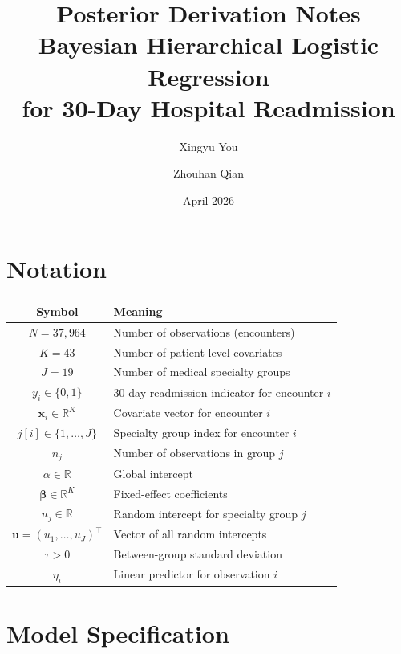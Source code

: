 \documentclass[11pt]{article}
\title{Posterior Derivation Notes\\[4pt]
       \large Bayesian Hierarchical Logistic Regression\\
       for 30-Day Hospital Readmission}
\author{Xingyu You \and Zhouhan Qian}
\date{April 2026}
\newcommand{\bx}{\bm{x}}
\newcommand{\bbeta}{\bm{\beta}}
\newcommand{\bu}{\bm{u}}
\begin{document}
\maketitle
\tableofcontents
\newpage

\section{Notation}

\begin{table}[h]
\centering
\begin{tabular}{cl}
\toprule
Symbol & Meaning \\
\midrule
$N = 37{,}964$ & Number of observations (encounters) \\
$K = 43$        & Number of patient-level covariates \\
$J = 19$        & Number of medical specialty groups \\
$y_i \in \{0,1\}$ & 30-day readmission indicator for encounter $i$ \\
$\bx_i \in \mathbb{R}^K$ & Covariate vector for encounter $i$ \\
$j[i] \in \{1,\dots,J\}$ & Specialty group index for encounter $i$ \\
$n_j$ & Number of observations in group $j$ \\
$\alpha \in \mathbb{R}$ & Global intercept \\
$\bbeta \in \mathbb{R}^K$ & Fixed-effect coefficients \\
$u_j \in \mathbb{R}$ & Random intercept for specialty group $j$ \\
$\bu = (u_1,\dots,u_J)^\top$ & Vector of all random intercepts \\
$\tau > 0$ & Between-group standard deviation \\
$\eta_i$ & Linear predictor for observation $i$ \\
\bottomrule
\end{tabular}
\end{table}

\section{Model Specification}
\label{sec:model}
\end{document}
